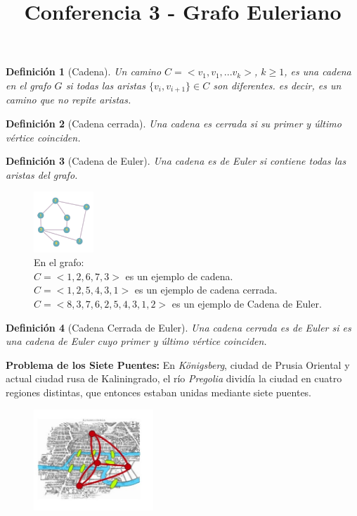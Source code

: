 \documentclass[a4paper,1pt]{report}
\title{Conferencia 3 - Grafo Euleriano}
\author{}
\newtheorem*{dfn}{Definición}
\begin{document}
\maketitle

\begin{dfn}[Cadena]
Un camino $C = <v_1,v_1,...v_k>$, $k \geq 1$,  es una cadena en el grafo $G$ si todas las  aristas $\{v_i, v_{i+1}\} \in C$ son diferentes. es decir, es un camino que no repite aristas.
\end{dfn}

\begin{dfn}[Cadena cerrada]
Una cadena es cerrada si su primer y \'ultimo v\'ertice coinciden.
\end{dfn}

\begin{dfn}[Cadena de Euler]
Una cadena es de Euler si contiene todas las aristas del grafo.
\end{dfn}


\begin{figure}
    \caption{En el grafo: \\ $C = <1,2,6,7,3>$ es un ejemplo de cadena. \\ $C = <1,2,5,4,3,1>$ es un ejemplo de cadena cerrada. \\ $C = <8,3,7,6,2,5,4,3,1,2>$ es un ejemplo de Cadena de Euler.}
    \includegraphics[width=0.2\textwidth]{figures3/Grafo.png}
    \end{figure}


\begin{dfn}[Cadena Cerrada de Euler]
    Una cadena cerrada es de Euler si es una cadena de Euler cuyo primer y \'ultimo v\'ertice coinciden.
\end{dfn}

\textbf{Problema de los Siete Puentes:} En \textit{Königsberg}, ciudad de Prusia Oriental y actual ciudad rusa de Kaliningrado, el r\'io \textit{Pregolia} divid\'ia la ciudad en cuatro regiones distintas, que entonces estaban unidas mediante siete puentes. 

\begin{figure}[H]
    \centering
    \includegraphics[width=0.4\textwidth]{figures3/puentes.jpg}
\end{figure}  
\end{document}
